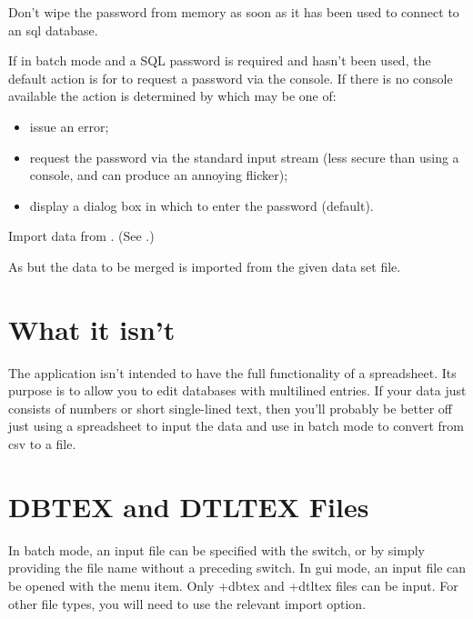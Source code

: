 Don't wipe the password from memory as soon as it 
has been used to connect to an \gls{sql} database.

If in batch mode and a SQL password is required
and  hasn't been used, the
default action is for  to request a password
via the console. If there is no console available
the action is determined by 
which may be one of:
\begin{itemize}
  \item {} issue an error;
  \item {} request the password via the standard
  input stream (less secure than using a console, and can produce 
  an annoying flicker);
  \item {} display a dialog box in which to enter the password (default).
\end{itemize}

Import  data from .
(See .)

As  but the data to be merged is imported from the
given  data set file.

\section{What it isn't}
\label{sec:notaspreadsheet}

The  application isn't intended to have the full functionality of
a spreadsheet. Its purpose is to allow you to edit 
 databases with multilined entries. If your data 
just consists of numbers or short single-lined text, then you'll probably 
be better off just using a spreadsheet to input the data and 
use  in batch mode to convert from \gls{csv} to 
a  file.

\section{DBTEX and DTLTEX Files}
\label{sec:fileext}

In batch mode, an input file can be specified with the 
switch, or by simply providing the file name without a preceding switch.
In \gls{gui} mode, an input file can be opened with the
 menu item. Only \ext+{dbtex} and \ext+{dtltex} files can be
input. For other file types, you will need to use the relevant
import option.

